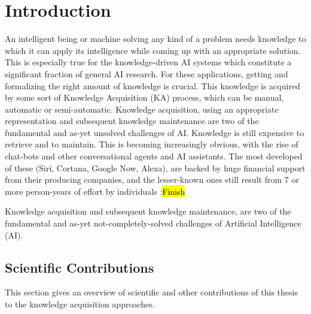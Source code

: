 % 
\chapter{Introduction}
An intelligent being or machine solving any kind of a problem needs knowledge to which it can apply its intelligence while coming up with an appropriate solution. This is especially true for the knowledge-driven AI systems which constitute a significant fraction of general AI research. For these applications, getting and formalizing the right amount of knowledge is crucial. This knowledge is acquired by some sort of Knowledge Acquisition (KA) process, which can be manual, automatic or semi-automatic. Knowledge acquisition, using an appropriate representation and subsequent knowledge maintenance are two of the fundamental and as-yet unsolved challenges of AI. Knowledge is still expensive to retrieve and to maintain. This is becoming increasingly obvious, with the rise of chat-bots and other conversational agents and AI assistants. The most developed of these (Siri, Cortana, Google Now, Alexa), are backed by huge financial support from their producing companies, and the lesser-known ones still result from 7 or more person-years of effort by individuals
\todo:{\hl{Finish}}

Knowledge acquisition and subsequent knowledge maintenance, are two of the fundamental and as-yet not-completely-solved challenges of Artificial Intelligence (AI).


\section{Scientific Contributions}
This section gives an overview of scientific and other contributions of this thesis to the knowledge acquisition approaches.

